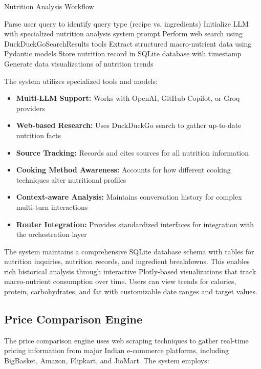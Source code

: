 \documentclass{ecai}
\begin{document}
\begin{algorithm}
\caption{Nutrition Analysis Workflow}
\begin{algorithmic}[1]
\State Parse user query to identify query type (recipe vs. ingredients)
\State Initialize LLM with specialized nutrition analysis system prompt
\State Perform web search using DuckDuckGoSearchResults tools
\State Extract structured macro-nutrient data using Pydantic models
\State Store nutrition record in SQLite database with timestamp
\State Generate data visualizations of nutrition trends
\end{algorithmic}
\end{algorithm}

The system utilizes specialized tools and models:

\begin{itemize}[noitemsep,topsep=0pt]
    \item \textbf{Multi-LLM Support:} Works with OpenAI, GitHub Copilot, or Groq providers
    \item \textbf{Web-based Research:} Uses DuckDuckGo search to gather up-to-date nutrition facts
    \item \textbf{Source Tracking:} Records and cites sources for all nutrition information
    \item \textbf{Cooking Method Awareness:} Accounts for how different cooking techniques alter nutritional profiles
    \item \textbf{Context-aware Analysis:} Maintains conversation history for complex multi-turn interactions
    \item \textbf{Router Integration:} Provides standardized interfaces for integration with the orchestration layer
\end{itemize}

The system maintains a comprehensive SQLite database schema with tables for nutrition inquiries, nutrition records, and ingredient breakdowns. This enables rich historical analysis through interactive Plotly-based visualizations that track macro-nutrient consumption over time. Users can view trends for calories, protein, carbohydrates, and fat with customizable date ranges and target values.

\subsection{Price Comparison Engine}

The price comparison engine uses web scraping techniques to gather real-time pricing information from major Indian e-commerce platforms, including BigBasket, Amazon, Flipkart, and JioMart. The system employs:
\end{document}
